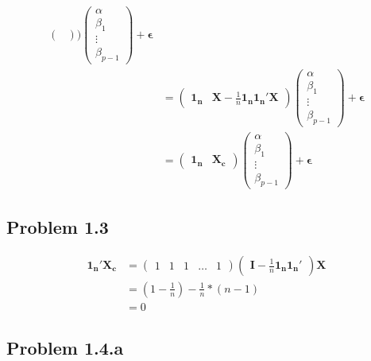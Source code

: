 \documentclass[a4paper]{article}
\begin{document}
\begin{align*}
\begin{pmatrix}
\end{pmatrix}\big)\begin{pmatrix}
\alpha\\
\beta_1\\
\vdots\\
\beta_{p-1}
\end{pmatrix} + \mathbf{\epsilon}\\
&= \begin{pmatrix}
\mathbf{1_n} & \mathbf{X}-\frac{1}{n}\mathbf{1_n1_n'X}
\end{pmatrix}\begin{pmatrix}
\alpha\\
\beta_1\\
\vdots\\
\beta_{p-1}
\end{pmatrix}+ \mathbf{\epsilon}\\
&= \begin{pmatrix}
\mathbf{1_n} & \mathbf{X_c}
\end{pmatrix}\begin{pmatrix}
\alpha\\
\beta_1\\
\vdots\\
\beta_{p-1}
\end{pmatrix}+ \mathbf{\epsilon}
\end{align*}

\subsection*{Problem 1.3}

\begin{align*}
\mathbf{1_n'X_c} &= \begin{pmatrix}
1 & 1 & 1 & \dots & 1
\end{pmatrix} \begin{pmatrix}
\mathbf{I}-\frac{1}{n}\mathbf{1_n1_n'}
\end{pmatrix}\mathbf{X}\\
&= (1-\frac{1}{n}) -\frac{1}{n}*(n-1)\\
&= 0
\end{align*}

\subsection*{Problem 1.4.a}
\end{document}
